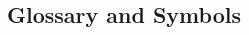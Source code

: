 \documentclass[a4paper,12pt]{article}
\begin{document}




\begin{thebibliography}{99}


\section*{Glossary and Symbols}


\end{thebibliography}
\end{document}
